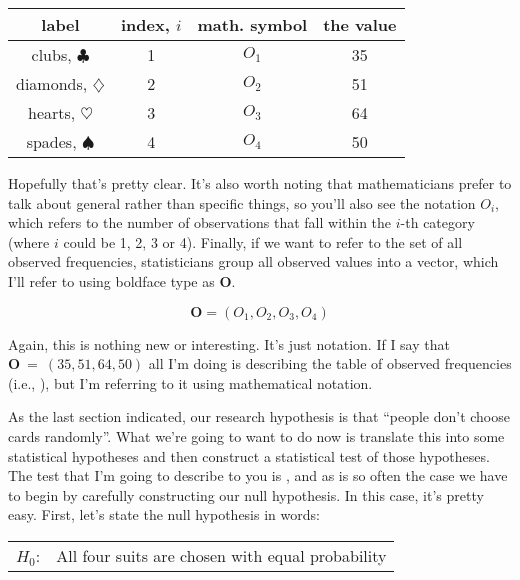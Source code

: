 \begin{center}
\begin{tabular}{cc|cc}
label &  index, $i$  & math. symbol &  the value \\  \hline
 clubs, $\clubsuit$ 	& 1 	& $O_1$ & 35 \\
 diamonds, $\diamondsuit$ & 2& $O_2$ & 51 \\
 hearts, $\heartsuit$	&3	& $O_3$ & 64 \\
 spades, $\spadesuit$ &4		& $O_4$ & 50 \\
\end{tabular}
\end{center}

\noindent
Hopefully that's pretty clear. It's also worth noting that mathematicians prefer to talk about general rather than specific things, so you'll also see the notation $O_i$, which refers to the number of observations that fall within the $i$-th category (where $i$ could be 1, 2, 3 or 4). Finally, if we want to refer to the set of all observed frequencies, statisticians group all observed values into a vector, which I'll refer to using boldface type as $\bm{O}$. 

$$
\bm{O} = (O_1, O_2, O_3, O_4)
$$

Again, this is nothing new or interesting. It's just notation. If I say that $\bm{O}~=~(35, 51, 64, 50)$ all I'm doing is describing the table of observed frequencies (i.e., ), but I'm referring to it using mathematical notation. 


As the last section indicated, our research hypothesis is that ``people don't choose cards randomly''. What we're going to want to do now is translate this into some statistical hypotheses and then construct a statistical test of those hypotheses. The test that I'm going to describe to you is , and as is so often the case we have to begin by carefully constructing our null hypothesis. In this case, it's pretty easy. First, let's state the null hypothesis in words:

\smallskip
\begin{tabular}{ll}
$H_0$: \hspace*{0.5cm} & All four suits are chosen with equal probability
\end{tabular} 
\smallskip

